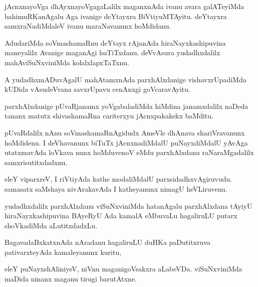 \documentclass{article}
\begin{document}
\begin{mn}
jAcnxnayoVga dhAyxnayoVgagaLalilx maganxnAda ivanu avara galATeyiMda 
bahimuRKanAgalu Aga ivanige deYtayxra BiVtiyuMTAyitu. deYtayxra 
samxraNadiMdaleV ivanu maraNavanunx hoMdidanu.
\end{mn}

\begin{mn}
AdudariMda soVmashamaRnu deYtayx rAjanAda hiraNayxkashipuvina maneyalilx 
Avanige maganAgi huTiTxdanu.  deVvAsura yudadhxdalilx mahAviSuNxviniMda 
kolalxlapxTaTxnu.
\end{mn}

\begin{mn}
A yudadhxmADuvAgalU mahAtamxnAda parxhAlxdanige vishavxrUpadiMda kUDida 
vAsudeVvana savxrUpavu cenAnxgi goVcaravAyitu.
\end{mn}

\begin{mn}
parxhAlxdanige pUvaRjanamx yoVgabaladiMda hiMdina janamxdalilx naDeda 
tananx matutx shivashamaRna cariterxyu jAcnxpakakekx baMditu.
\end{mn}

\begin{mn}
pUvaRdalilx nAnu soVmashamaRnAgidudx AmeVle dhAnava shariVravanunx 
hoMdidenu. I deVhavanunx biTuTx jAcnxnadiMdalU puNayxdiMdalU yAvAga 
utatxmavAda loVkava
nunx hoMduvenoV eMdu parxhAlxdanu raNaraMgadalilx samxrisutitxdadxnu.
\end{mn}

\begin{mn}
eleY viparxreV, I riVtiyAda kathe modaliMdalU parxsidadhxvAgiruvudu. 
samasatx saMshaya nivArakavAda I katheyanunx nimagU heVLiruvenu.
\end{mn}

\begin{mn}
yudadhxdalilx parxhAlxdanu viSuNxviniMda hatanAgalu parxhAlxdana tAyiyU
hiraNayxkashipuvina BAyeRyU Ada kamalA eMbuvaLu hagaliruLU putarx 
shoVkadiMda aLutitxdadxLu.
\end{mn}

\begin{mn}
BagavadaBxkatxnAda nAradanu hagaliruLU duHKa paDutitxruva pativarxteyAda
kamaleyanunx kuritu,
\end{mn}

\begin{mn}
eleY puNayxshAliniyeV, niVnu maganigoVsakxra aLabeVDa. viSuNxviniMda maDida 
ninanx maganu tirugi barutAtxne.
\end{mn}
\end{document}
